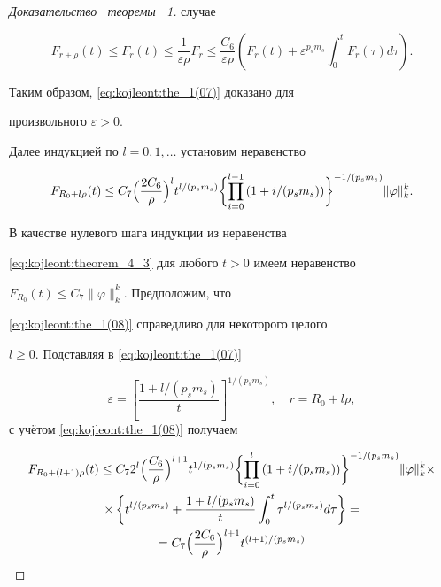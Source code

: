 \begin{proof}[Доказательство \ теоремы \ 1]
случае

$$

F_{r+\rho}(t)\leq F_r(t)\leq\frac{1}{\varepsilon\rho}

F_r\leq\frac{C_6}{\varepsilon\rho}\left(F_r(t)+\varepsilon^{p_sm_s} \int _0^tF_r(\tau)d\tau\right).

$$

Таким образом, \eqref{eq:kojleont:the_1(07)} доказано для

произвольного $\varepsilon>0$.



Далее индукцией по $l=0, 1, \dots $ установим неравенство

\begin{equation}

\label{eq:kojleont:the_1(08)} F_{R_0+l\rho}(t)\leq C_7 

\Bigl(\frac{2C_6}{\rho}\Bigr)^lt^{l/(p_sm_s)}\biggl\{\prod\limits_{i=0}^{l-1}

\left(1+{i}/{(p_sm_s)}\right)\biggr\}^{-1/(p_sm_s)}  \|\varphi\|_k^k.

\end{equation}

В качестве нулевого шага индукции из неравенства

\eqref{eq:kojleont:theorem_4_3} для любого $t>0$ имеем неравенство

$F_{R_0}(t)\leq C_7\|\varphi\|_k^k$. Предположим, что

\eqref{eq:kojleont:the_1(08)} справедливо для некоторого целого

$l\geq 0$. Подставляя в \eqref{eq:kojleont:the_1(07)}

$$\varepsilon=\left[\frac{1+{l}/(p_sm_s)}{t}\right]^{1/(p_sm_s)},\quad r=R_0+l\rho,$$ с учётом \eqref{eq:kojleont:the_1(08)} получаем

\begin{multline*}

F_{R_0+(l+1)\rho}(t)\leq

C_72^l\Bigl(\frac{C_6}{\rho}\Bigr)^{l+1}t^{1/(p_sm_s)}

\biggl\{\prod\limits_{i=0}^{l}\left(1+{i}/(p_sm_s)\right)\biggr\}^{-1/(p_sm_s)}

\|\varphi\|_k^k\times \\

\times\left\{t^{l/(p_sm_s)}+\frac{1+l/(p_sm_s)}{t} \int _0^t\tau^{l/(p_sm_s)}d\tau\right\}=\\

=C_7\Bigl(\frac{2C_6} {\rho}\Bigr)^{l+1}t^{(l+1)/(p_sm_s)}


\end{multline*}
\end{proof}
